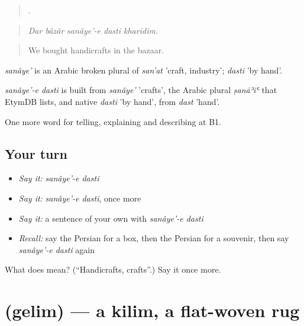 \begin{quote}
    .
\end{quote}

\begin{quote}
\emph{Dar bâzâr sanâye'-e dasti kharidim.}
\end{quote}

\begin{quote}
We bought handicrafts in the bazaar.
\end{quote}

\emph{sanâye'} is an Arabic broken plural of \emph{san'at} 'craft, industry'; \emph{dasti} 'by hand'.

\begin{cousinweb}
\emph{sanâye'-e dasti} is built from \emph{sanâye'} 'crafts', the Arabic plural \emph{ṣanāʾiʿ} that EtymDB lists, and native \emph{dasti} 'by hand', from \emph{dast} 'hand'.
\end{cousinweb}

\begin{grammarlens}[title={What you've built}]
One more word for telling, explaining and describing at B1.
\end{grammarlens}

\subsection*{Your turn}
\begin{itemize}
\raggedright
  \item \emph{Say it:} \emph{sanâye'-e dasti}
  \item \emph{Say it:} \emph{sanâye'-e dasti}, once more
  \item \emph{Say it:} a sentence of your own with \emph{sanâye'-e dasti}
  \item \emph{Recall:} say the Persian for a box, then the Persian for a souvenir, then say \emph{sanâye'-e dasti} again
\end{itemize}

\begin{tcolorbox}[breakable,colback=teal!4,colframe=teal!35!black,title={Before you move on}]
What does   mean? (\textquotedblleft{}Handicrafts, crafts\textquotedblright{}.) Say it once more.
\end{tcolorbox}
\section[\texorpdfstring{\fa{گلیم} (gelim)}{گلیم (gelim)}]{ (gelim) — a kilim, a flat-woven rug}

